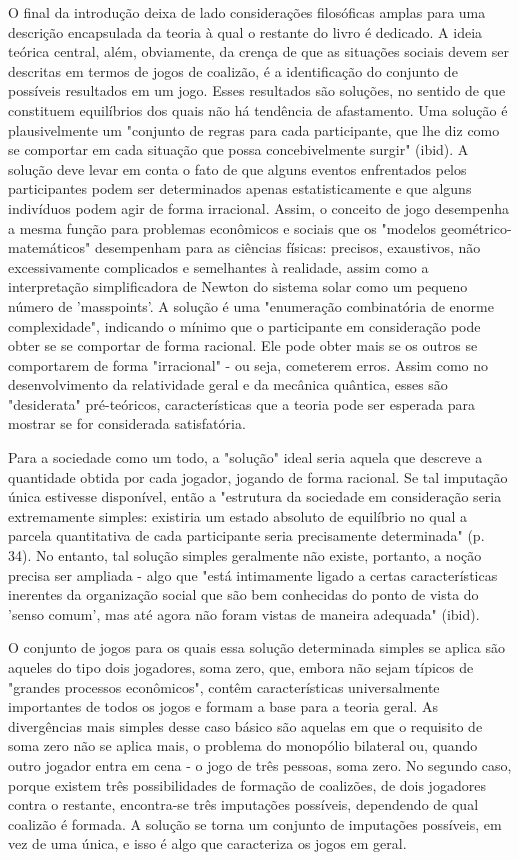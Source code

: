 \documentclass[12pt]{article}
\begin{document}
O final da introdução deixa de lado considerações filosóficas amplas para uma descrição encapsulada da teoria à qual o restante do livro é dedicado. A ideia teórica central, além, obviamente, da crença de que as situações sociais devem ser descritas em termos de jogos de coalizão, é a identificação do conjunto de possíveis resultados em um jogo. Esses resultados são soluções, no sentido de que constituem equilíbrios dos quais não há tendência de afastamento. Uma solução é plausivelmente um "conjunto de regras para cada participante, que lhe diz como se comportar em cada situação que possa concebivelmente surgir" (ibid). A solução deve levar em conta o fato de que alguns eventos enfrentados pelos participantes podem ser determinados apenas estatisticamente e que alguns indivíduos podem agir de forma irracional. Assim, o conceito de jogo desempenha a mesma função para problemas econômicos e sociais que os "modelos geométrico-matemáticos" desempenham para as ciências físicas: precisos, exaustivos, não excessivamente complicados e semelhantes à realidade, assim como a interpretação simplificadora de Newton do sistema solar como um pequeno número de 'masspoints'. A solução é uma "enumeração combinatória de enorme complexidade", indicando o mínimo que o participante em consideração pode obter se se comportar de forma racional. Ele pode obter mais se os outros se comportarem de forma "irracional" - ou seja, cometerem erros. Assim como no desenvolvimento da relatividade geral e da mecânica quântica, esses são "desiderata" pré-teóricos, características que a teoria pode ser esperada para mostrar se for considerada satisfatória.

Para a sociedade como um todo, a "solução" ideal seria aquela que descreve a quantidade obtida por cada jogador, jogando de forma racional. Se tal imputação única estivesse disponível, então a "estrutura da sociedade em consideração seria extremamente simples: existiria um estado absoluto de equilíbrio no qual a parcela quantitativa de cada participante seria precisamente determinada" (p. 34). No entanto, tal solução simples geralmente não existe, portanto, a noção precisa ser ampliada - algo que "está intimamente ligado a certas características inerentes da organização social que são bem conhecidas do ponto de vista do 'senso comum', mas até agora não foram vistas de maneira adequada" (ibid).

O conjunto de jogos para os quais essa solução determinada simples se aplica são aqueles do tipo dois jogadores, soma zero, que, embora não sejam típicos de "grandes processos econômicos", contêm características universalmente importantes de todos os jogos e formam a base para a teoria geral. As divergências mais simples desse caso básico são aquelas em que o requisito de soma zero não se aplica mais, o problema do monopólio bilateral ou, quando outro jogador entra em cena - o jogo de três pessoas, soma zero. No segundo caso, porque existem três possibilidades de formação de coalizões, de dois jogadores contra o restante, encontra-se três imputações possíveis, dependendo de qual coalizão é formada. A solução se torna um conjunto de imputações possíveis, em vez de uma única, e isso é algo que caracteriza os jogos em geral.
\end{document}
